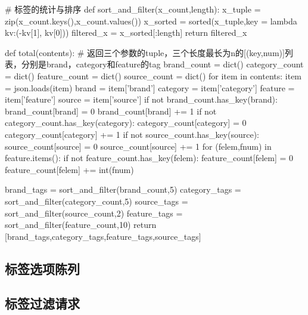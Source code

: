 \begin{python}
# 标签的统计与排序
def sort_and_filter(x_count,length):
    x_tuple = zip(x_count.keys(),x_count.values())
    x_sorted = sorted(x_tuple,key = lambda kv:(-kv[1], kv[0]))
    filtered_x = x_sorted[:length]
    return filtered_x

def total(contents):
    # 返回三个参数的tuple，三个长度最长为n的[(key,num)]列表，分别是brand，category和feature的tag
    brand_count = dict()
    category_count = dict()
    feature_count = dict()
    source_count = dict()
    for item in contents:
        item = json.loads(item)
        brand = item['brand']
        category = item['category']
        feature = item['feature']
        source = item['source']
        if not brand_count.has_key(brand):
            brand_count[brand] = 0
        brand_count[brand] += 1
        if not category_count.has_key(category):
            category_count[category] = 0
        category_count[category] += 1
        if not source_count.has_key(source):
            source_count[source] = 0
        source_count[source] += 1
        for (felem,fnum) in feature.items():
            if not feature_count.has_key(felem):
                feature_count[felem] = 0
            feature_count[felem] += int(fnum)

    brand_tags = sort_and_filter(brand_count,5)
    category_tags = sort_and_filter(category_count,5)
    source_tags = sort_and_filter(source_count,2)
    feature_tags = sort_and_filter(feature_count,10)
    return [brand_tags,category_tags,feature_tags,source_tags]
\end{python}


\subsection{标签选项陈列}


\subsection{标签过滤请求}

